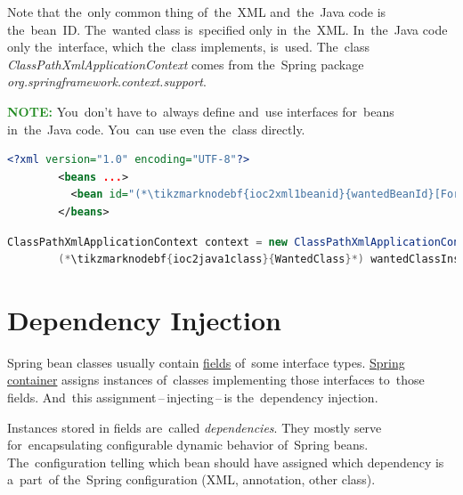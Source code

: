 \documentclass[12pt, dvipsnames, oneside, a4paper, titlepage, usenames]{report}
\newcommand{\newsection}[1]{\section*{#1}\addcontentsline{toc}{section}{#1}}
\newcommand{\highlight}[2]{\vspace{\baselineskip}\noindent\textcolor{#2}{\textbf{#1}}}
\newcommand{\note}{\highlight{NOTE: }{ForestGreen}}
\begin{document}
    \vspace{\baselineskip}
    \noindent Note that the~only common thing of~the~XML and~the~Java code is the~bean~ID. The~wanted class is~specified only in~the~XML. In~the~Java code only the~interface, which the~class implements, is~used. The~class \textit{ClassPathXmlApplicationContext} comes from the~Spring package \textit{org.springframework.context.support}.

    \note You~don't have to~always define and~use interfaces for~beans in~the~Java code. You~can use even the~class directly.
    \begin{lstlisting}[language=XML, title={Configuration XML}]
        <?xml version="1.0" encoding="UTF-8"?>
        <beans ...>
          <bean id="(*\tikzmarknodebf{ioc2xml1beanid}{wantedBeanId}[ForestGreen]*)" class="package.subfolder.(*\tikzmarknodebf{ioc2xml1class}{WantedClass}[ForestGreen]*)"/>
        </beans>
    \end{lstlisting}
    \begin{lstlisting}[language=Java, title={Usage}]
        ClassPathXmlApplicationContext context = new ClassPathXmlApplicationContext("configurationFile.xml");
        (*\tikzmarknodebf{ioc2java1class}{WantedClass}*) wantedClassInstance = context.getBean("(*\tikzmarknodebf{ioc2java1beanid}{wantedBeanId}[ForestGreen]*)", (*\tikzmarknodebf{ioc2java1class2}{WantedClass}*).class);
    \end{lstlisting}

    \newsection{Dependency Injection}
    \label{dependencyinjection}
    Spring bean classes usually contain \hyperref[variablefieldproperty]{fields} of~some interface types. \hyperref[springcontainrer]{Spring container} assigns instances of~classes implementing those interfaces to~those fields. And~this assignment\,--\,injecting\,--\,is the~dependency injection.

    Instances stored in fields are~called \textit{dependencies}. They mostly serve for~encapsulating configurable dynamic behavior of~Spring beans. The~configuration telling which bean should have assigned which dependency is a~part~of the~Spring configuration (XML, annotation, other class).
\end{document}
